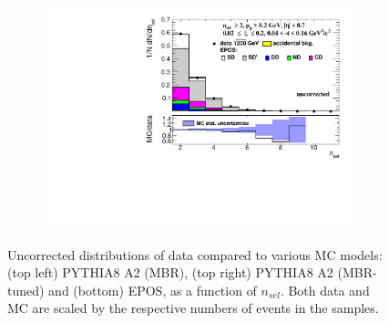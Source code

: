 \begin{figure}[h!]
\begin{subfigure}{.49\textwidth}
		\includegraphics[width=\linewidth, page=1]{chapters/chrgSTAR/img/nonSD/chrg/SDT_epos_xi0_RP_starsim_nsel.pdf}
	\end{subfigure}
	\begin{minipage}{.49\textwidth}
		\caption[Uncorrected distributions of data compared to various MC models: PYTHIA8 A2 (MBR), PYTHIA8 A2 (MBR-tuned) and EPOS, as a function of $n_{sel}$.]{Uncorrected distributions of data compared to various MC models: (top left) PYTHIA8 A2 (MBR), (top right) PYTHIA8 A2 (MBR-tuned) and (bottom) EPOS, as a function of $n_{sel}$. Both data and MC are scaled by the respective numbers of events in the samples.}
		\label{fig:nonSDnsel}
	\end{minipage}
	
\end{figure}
